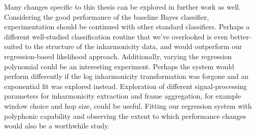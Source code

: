 \documentclass[12pt]{cmuthesis}
\begin{document}
Many changes specific to this thesis can be explored in further work as well. Considering the good performance of the baseline Bayes classifier, experimentation should be continued with other standard classifiers. Perhaps a different well-studied classification routine that we've overlooked is even better-suited to the structure of the inharmonicity data, and would outperform our regression-based likelihood approach. Additionally, varying the regression polynomial could be an interesting experiment. Perhaps the system would perform differently if the log inharmonicity transformation was forgone and an exponential fit was explored instead. Exploration of different signal-processing parameters for inharmonicity extraction and frame aggregation, for example window choice and hop size, could be useful. Fitting our regression system with polyphonic capability and observing the extent to which performance changes would also be a worthwhile study.



\end{document}
